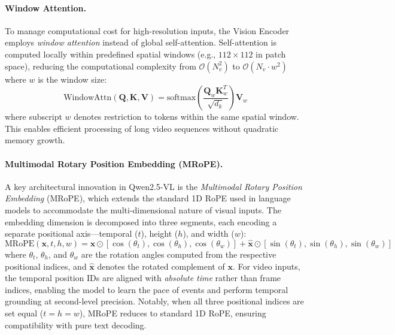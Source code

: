 \paragraph{Window Attention.}
To manage computational cost for high-resolution inputs, the Vision Encoder employs \emph{window attention} instead of global self-attention. Self-attention is computed locally within predefined spatial windows (e.g., $112 \times 112$ in patch space), reducing the computational complexity from $\mathcal{O}(N_v^2)$ to $\mathcal{O}(N_v \cdot w^2)$ where $w$ is the window size:
\begin{equation}
    \text{WindowAttn}(\mathbf{Q}, \mathbf{K}, \mathbf{V}) = \text{softmax}\!\left(\frac{\mathbf{Q}_w \mathbf{K}_w^T}{\sqrt{d_k}}\right) \mathbf{V}_w
    \label{eq:qwen_windowattn}
\end{equation}
where subscript $w$ denotes restriction to tokens within the same spatial window. This enables efficient processing of long video sequences without quadratic memory growth.

\paragraph{Multimodal Rotary Position Embedding (MRoPE).}
A key architectural innovation in Qwen2.5-VL is the \emph{Multimodal Rotary Position Embedding} (MRoPE), which extends the standard 1D RoPE used in language models to accommodate the multi-dimensional nature of visual inputs. The embedding dimension is decomposed into three segments, each encoding a separate positional axis---temporal ($t$), height ($h$), and width ($w$):
\begin{equation}
    \text{MRoPE}(\mathbf{x}, t, h, w) = \mathbf{x} \odot \left[\cos(\theta_t), \cos(\theta_h), \cos(\theta_w)\right] + \hat{\mathbf{x}} \odot \left[\sin(\theta_t), \sin(\theta_h), \sin(\theta_w)\right]
    \label{eq:qwen_mrope}
\end{equation}
where $\theta_t$, $\theta_h$, and $\theta_w$ are the rotation angles computed from the respective positional indices, and $\hat{\mathbf{x}}$ denotes the rotated complement of $\mathbf{x}$. For video inputs, the temporal position IDs are aligned with \emph{absolute time} rather than frame indices, enabling the model to learn the pace of events and perform temporal grounding at second-level precision. Notably, when all three positional indices are set equal ($t = h = w$), MRoPE reduces to standard 1D RoPE, ensuring compatibility with pure text decoding.

